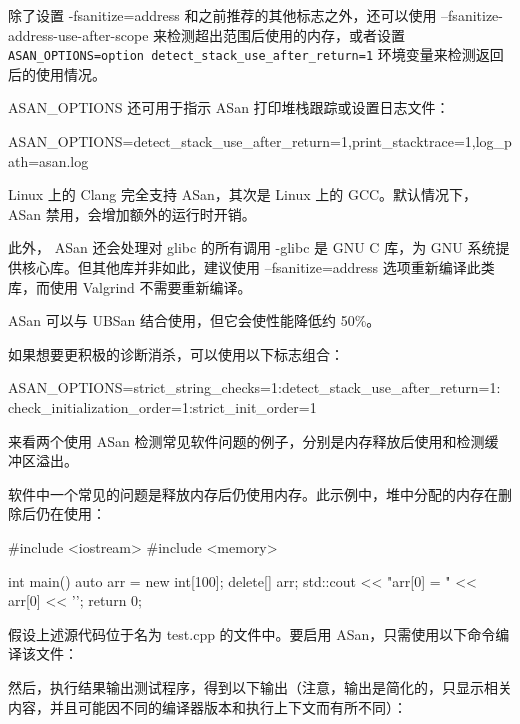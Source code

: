 除了设置 -fsanitize=address 和之前推荐的其他标志之外，还可以使用 –fsanitize-address-use-after-scope 来检测超出范围后使用的内存，或者设置 \verb|ASAN_OPTIONS=option detect_stack_use_after_return=1| 环境变量来检测返回后的使用情况。

ASAN\_OPTIONS 还可用于指示 ASan 打印堆栈跟踪或设置日志文件：

\begin{shell}
ASAN_OPTIONS=detect_stack_use_after_return=1,print_stacktrace=1,log_path=asan.log
\end{shell}

Linux 上的 Clang 完全支持 ASan，其次是 Linux 上的 GCC。默认情况下， ASan 禁用，会增加额外的运行时开销。

此外， ASan 还会处理对 glibc 的所有调用 -glibc 是 GNU C 库，为 GNU 系统提供核心库。但其他库并非如此，建议使用 –fsanitize=address 选项重新编译此类库，而使用 Valgrind 不需要重新编译。

ASan 可以与 UBSan 结合使用，但它会使性能降低约 50\%。

如果想要更积极的诊断消杀，可以使用以下标志组合：

\begin{shell}
ASAN_OPTIONS=strict_string_checks=1:detect_stack_use_after_return=1: check_initialization_order=1:strict_init_order=1
\end{shell}

来看两个使用 ASan 检测常见软件问题的例子，分别是内存释放后使用和检测缓冲区溢出。


软件中一个常见的问题是释放内存后仍使用内存。此示例中，堆中分配的内存在删除后仍在使用：

\begin{cpp}
#include <iostream>
#include <memory>

int main() {
    auto arr = new int[100];
    delete[] arr;
    std::cout << "arr[0] = " << arr[0] << '\n';
    return 0;
}
\end{cpp}

假设上述源代码位于名为 test.cpp 的文件中。要启用 ASan，只需使用以下命令编译该文件：


然后，执行结果输出测试程序，得到以下输出（注意，输出是简化的，只显示相关内容，并且可能因不同的编译器版本和执行上下文而有所不同）：

